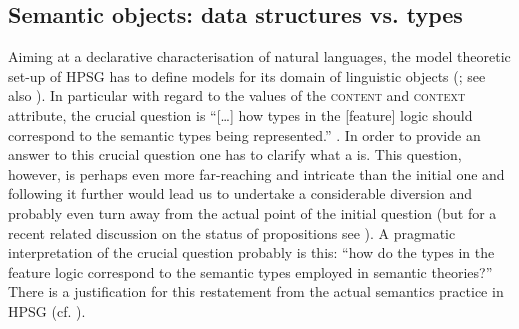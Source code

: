 \documentclass[output=paper]{langsci/langscibook}
\begin{document}
{  
\subsection{Semantic objects: data structures vs. types}
\label{sec:semantic-objects}

Aiming at a declarative characterisation of natural languages, the model theoretic set-up of HPSG has to define models for its domain of linguistic objects  (\citet[Sec.~3]{Levine:Meurers:2006}; see also ).
%
In particular with regard to the values of the \textsc{content} and \textsc{context} attribute, the crucial question is \enquote{[\ldots] how types in the [feature] logic should correspond to the semantic types being represented.}  \citet[]{Penn:2000}.
%
In order to provide an answer to this crucial question one has to clarify what a  is. 
%
This question, however, is perhaps even more far-reaching and intricate than the initial one and following it further would lead us to undertake a considerable diversion and probably even turn away from the actual point of the initial question (but for a recent related discussion on the status of propositions see \citep{King:Soames:Speaks:2014}).
%
A pragmatic interpretation of the crucial question probably is this: \enquote{how do the types in the feature logic correspond to the semantic types employed in semantic theories?}
%
There is a justification for this restatement from the actual semantics practice in HPSG (cf. ).

}
\end{document}
